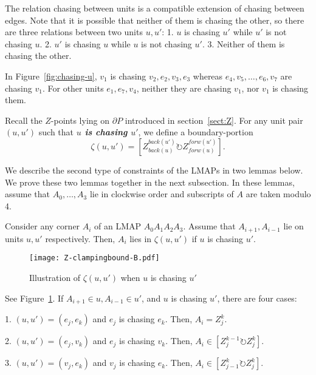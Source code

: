 \documentclass{ws-ijcga}
\begin{document}
The relation chasing between units is a compatible extension of chasing between edges.
Note that it is possible that neither of them is chasing the other, so there are three relations between two units $u,u'$:
1. $u$ is chasing $u'$ while $u'$ is not chasing $u$.
2. $u'$ is chasing $u$ while $u$ is not chasing $u'$. 3. Neither of them is chasing the other.

In Figure~\ref{fig:chasing-u}, $v_1$ is chasing $v_2,e_2,v_3,e_3$ whereas $e_4,v_5,\ldots,e_6,v_7$ are chasing $v_1$. For other units $e_1,e_7,v_4$, neither they are chasing $v_1$, nor $v_1$ is chasing them.

\begin{definition}[$\zeta$]\label{def:zeta}
Recall the $Z$-points lying on $\partial P$ introduced in section~\ref{sect:Z}.
For any unit pair $(u,u')$ such that \textbf{\emph{$u$ is chasing $u'$}}, we define a boundary-portion
    \begin{equation}\label{eqn:zeta_chasing}
        \zeta(u,u')= [Z_{back(u)}^{back(u')} \circlearrowright Z_{forw(u)}^{forw(u')}].
    \end{equation}
\end{definition}

We describe the second type of constraints of the LMAPs in two lemmas below.
We prove these two lemmas together in the next subsection.
In these lemmas, assume that $A_0,\ldots,A_3$ lie in clockwise order and subscripts of $A$ are taken modulo 4.

\begin{lemma}\label{lemma:clamping-broad}
Consider any corner $A_i$ of an LMAP $A_0A_1A_2A_3$.
Assume that $A_{i+1},A_{i-1}$ lie on units $u,u'$ respectively.
Then, $A_i$ lies in $\zeta(u,u')$ if $u$ is chasing $u'$.
\end{lemma}

\begin{figure}[h]
  \centering \texttt{[image: Z-clampingbound-B.pdf]}
  \caption{Illustration of $\zeta(u,u')$ when $u$ is chasing $u'$}\label{fig:BP}
\end{figure}

See Figure~\ref{fig:BP}. If $A_{i+1}\in u,A_{i-1}\in u'$, and $u$ is chasing $u'$, there are four cases:

1. $(u,u')=(e_j,e_k)$ and $e_j$ is chasing $e_k$. Then, $A_i=Z_j^k$.

2. $(u,u')=(e_j,v_k)$ and $e_j$ is chasing $v_k$. Then, $A_i\in [Z_j^{k-1} \circlearrowright Z_j^k]$.

3. $(u,u')=(v_j,e_k)$ and $v_j$ is chasing $e_k$. Then, $A_i\in [Z_{j-1}^{k}\circlearrowright Z_j^k]$.
\end{document}
